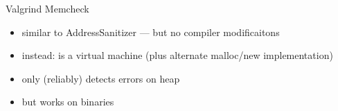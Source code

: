 

\begin{frame}{Valgrind Memcheck}
    \begin{itemize}
    \item similar to AddressSanitizer --- but no compiler modificaitons
    \item instead: is a virtual machine (plus alternate malloc/new implementation)
    \vspace{.5cm}
    \item only (reliably) detects errors on heap
    \item but works on  binaries
    \end{itemize}
\end{frame}


